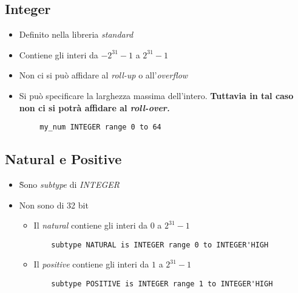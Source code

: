 \documentclass{article}
\begin{document}
\subsection{Integer}
\begin{itemize}
	\item Definito nella libreria \textit{standard}
	\item Contiene gli interi da \(-2^{31}-1\) a \(2^{31}-1\)
	\item Non ci si può affidare al \textit{roll-up} o all'\textit{overflow}
	\item Si può specificare la larghezza massima dell'intero. \textbf{Tuttavia in tal caso non ci si potrà affidare al \textit{roll-over.}} 
\end{itemize}
\begin{verbatim}
        my_num INTEGER range 0 to 64
\end{verbatim}
\subsection{Natural e Positive}
\begin{itemize}
	\item \`Sono \textit{subtype} di \textit{INTEGER}
	\item Non sono di 32 bit
	\begin{itemize}
		\item Il \textit{natural} contiene gli interi da \(0\) a \(2^{31}-1\)
\begin{verbatim}
    subtype NATURAL is INTEGER range 0 to INTEGER'HIGH
 \end{verbatim}
		\item Il \textit{positive} contiene gli interi da \(1\) a \(2^{31}-1\)
\begin{verbatim}
    subtype POSITIVE is INTEGER range 1 to INTEGER'HIGH
 \end{verbatim}
	\end{itemize}	
\end{itemize}
\end{document}
